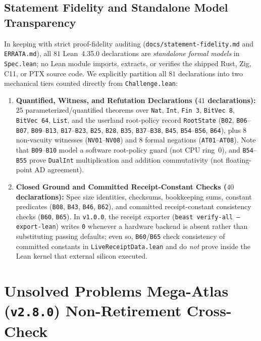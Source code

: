 \documentclass[11pt,letterpaper]{amsart}
\newcommand{\code}[1]{{\small\texttt{#1}}}
\begin{document}
\subsection{Statement Fidelity and Standalone Model Transparency}
In keeping with strict proof-fidelity auditing (\code{docs/statement-fidelity.md}
and \code{ERRATA.md}), all $81$ Lean~4.35.0 declarations are \emph{standalone
formal models} in \code{Spec.lean}; no Lean module imports, extracts, or verifies
the shipped Rust, Zig, C11, or PTX source code. We explicitly partition all $81$
declarations into two mechanical tiers counted directly from \code{Challenge.lean}:
\begin{enumerate}
  \item \textbf{Quantified, Witness, and Refutation Declarations ($41$ declarations):}
  $25$ parameterized/quantified theorems over \code{Nat}, \code{Int}, \code{Fin 3},
  \code{BitVec 8}, \code{BitVec 64}, \code{List}, and the userland root-policy
  record \code{RootState} (\code{B02}, \code{B06}--\code{B07}, \code{B09}--\code{B13},
  \code{B17}--\code{B23}, \code{B25}, \code{B28}, \code{B35}, \code{B37}--\code{B38},
  \code{B45}, \code{B54}--\code{B56}, \code{B64}), plus $8$ non-vacuity witnesses
  (\code{NV01}--\code{NV08}) and $8$ formal negations (\code{AT01}--\code{AT08}).
  Note that \code{B09}--\code{B10} model a software root-policy guard (not CPU
  ring~0), and \code{B54}--\code{B55} prove \code{DualInt} multiplication and
  addition commutativity (not floating-point AD agreement).
  \item \textbf{Closed Ground and Committed Receipt-Constant Checks ($40$ declarations):}
  Spec size identities, checksums, bookkeeping sums, constant predicates
  (\code{B08}, \code{B43}, \code{B46}, \code{B62}), and committed receipt-constant
  consistency checks (\code{B60}, \code{B65}). In \code{v1.0.0}, the receipt
  exporter (\code{beast verify-all --export-lean}) writes \code{0} whenever a
  hardware backend is absent rather than substituting passing defaults; even so,
  \code{B60}/\code{B65} check consistency of committed constants in
  \code{LiveReceiptData.lean} and do \emph{not} prove inside the Lean kernel that
  external silicon executed.
\end{enumerate}

\section{Unsolved Problems Mega-Atlas (\texorpdfstring{\code{v2.8.0}}{v2.8.0}) Non-Retirement Cross-Check}
\label{sec:atlas}
\end{document}
